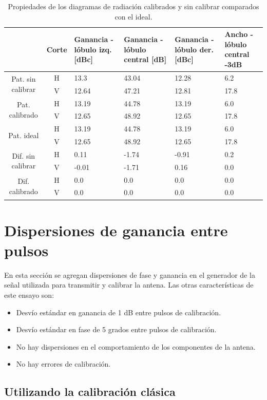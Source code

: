 \begin{table}[H]
  \footnotesize
  \centering
  \begin{tabular}{|c|c|p{2cm}|p{2.5cm}|p{2.5cm}|p{2.5cm}|}
    \cline{2-6}
    \multicolumn{1}{c|}{} & Corte & Ganancia - lóbulo izq. [dBc] & Ganancia - lóbulo central [dB] &
    Ganancia - lóbulo der. [dBc] & Ancho - lóbulo central -3dB \tabularnewline\hline
    \multirow{2}{2cm}{Pat. sin calibrar} & H & 13.3 & 43.04 & 12.28 & 6.2 \tabularnewline\cline{2-6}
     & V & 12.64 & 47.21 & 12.81 & 17.8 \tabularnewline\hline
    \multirow{2}{2cm}{Pat. calibrado} & H & 13.19 & 44.78 & 13.19 & 6.0 \tabularnewline\cline{2-6}
     & V & 12.65 & 48.92 & 12.65 & 17.8 \tabularnewline\hline
    \multirow{2}{2cm}{Pat. ideal} & H & 13.19 & 44.78 & 13.19 & 6.0 \tabularnewline\cline{2-6}
     & V & 12.65 & 48.92 & 12.65 & 17.8 \tabularnewline\hline
    \multirow{2}{2cm}{Dif. sin calibrar} & H & 0.11 & -1.74 & -0.91 & 0.2\tabularnewline\cline{2-6}
     & V & -0.01 & -1.71 & 0.16 & 0.0 \tabularnewline\hline
    \multirow{2}{2cm}{Dif. calibrado} & H & 0.0 & 0.0 & 0.0 & 0.0 \tabularnewline\cline{2-6}
     & V & 0.0 & 0.0 & 0.0 & 0.0 \tabularnewline\hline
  \end{tabular}
  \caption{Propiedades de los diagramas de radiación calibrados y sin calibrar comparados con el ideal.}
  \label{tab:compErrMutual10degRow}
\end{table}


\section{Dispersiones de ganancia entre pulsos}

En esta sección se agregan dispersiones de fase y ganancia en el generador de la señal utilizada para transmitir y calibrar 
la antena. Las otras características de este ensayo son:
\begin{itemize}
	\item Desvío estándar en ganancia de 1 dB entre pulsos de calibración.
	\item Desvío estándar en fase de 5 grados entre pulsos de calibración.
	\item No hay dispersiones en el comportamiento de los componentes de la antena.
	\item No hay errores de calibración.
\end{itemize}

\subsection{Utilizando la calibración clásica}

